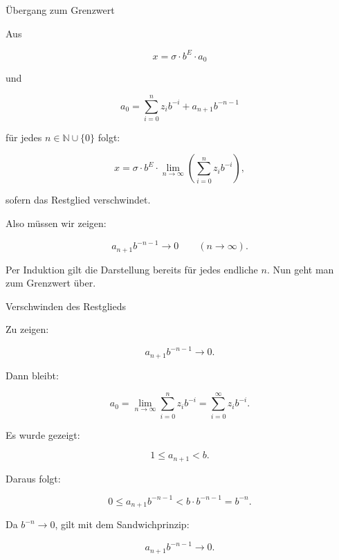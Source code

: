 \documentclass{beamer}
\newcommand{\N}{\mathbb{N}}
\begin{document}
\begin{frame}{Übergang zum Grenzwert}

\small

Aus

\[
x=\sigma \cdot b^E \cdot a_0
\]

und

\[
a_0=
\sum_{i=0}^{n} z_i b^{-i}
+
a_{n+1}b^{-n-1}
\]

für jedes \(n\in\N\cup\{0\}\) folgt:

\[
x=
\sigma \cdot b^E \cdot
\lim_{n\to\infty}
\left(
\sum_{i=0}^{n} z_i b^{-i}
\right),
\]

sofern das Restglied verschwindet.

\vspace{0.3cm}

Also müssen wir zeigen:

\[
a_{n+1}b^{-n-1}\to 0
\qquad (n\to\infty).
\]

\vspace{0.3cm}

Per Induktion gilt die Darstellung bereits für jedes endliche \(n\).  
Nun geht man zum Grenzwert über.

\end{frame}

\begin{frame}{Verschwinden des Restglieds}

\small

Zu zeigen:

\[
a_{n+1}b^{-n-1}\to 0.
\]

Dann bleibt:

\[
a_0=
\lim_{n\to\infty}\sum_{i=0}^{n} z_i b^{-i}
=
\sum_{i=0}^{\infty} z_i b^{-i}.
\]

\vspace{0.4cm}

Es wurde gezeigt:

\[
1\leq a_{n+1}<b.
\]

Daraus folgt:

\[
0\leq a_{n+1}b^{-n-1}
<
b\cdot b^{-n-1}
=
b^{-n}.
\]

Da \(b^{-n}\to 0\), gilt mit dem Sandwichprinzip:

\[
a_{n+1}b^{-n-1}\to 0.
\]

\end{frame}
\end{document}
